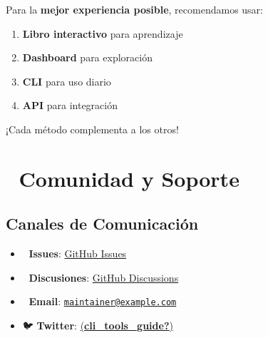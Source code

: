 \documentclass[
  11pt,
  letterpaper,
  oneside,
  openany]{scrbook}
\providecommand{\tightlist}{%
  \setlength{\itemsep}{0pt}\setlength{\parskip}{0pt}}
\begin{document}
\begin{tcolorbox}[enhanced jigsaw, coltitle=black, breakable, arc=.35mm, toprule=.15mm, colbacktitle=quarto-callout-important-color!10!white, colframe=quarto-callout-important-color-frame, opacityback=0, colback=white, bottomtitle=1mm, bottomrule=.15mm, rightrule=.15mm, left=2mm, toptitle=1mm, leftrule=.75mm, title=\textcolor{quarto-callout-important-color}{\faExclamation}\hspace{0.5em}{¡Importante!}, titlerule=0mm, opacitybacktitle=0.6]

Para la \textbf{mejor experiencia posible}, recomendamos usar:

\begin{enumerate}
\def\labelenumi{\arabic{enumi}.}
\tightlist
\item
  \textbf{Libro interactivo} para aprendizaje
\item
  \textbf{Dashboard} para exploración
\item
  \textbf{CLI} para uso diario
\item
  \textbf{API} para integración
\end{enumerate}

¡Cada método complementa a los otros! 🌟

\end{tcolorbox}

\section{🤝 Comunidad y Soporte}\label{comunidad-y-soporte}

\subsection{Canales de Comunicación}\label{canales-de-comunicaciuxf3n}

\begin{itemize}
\tightlist
\item
  🐛 \textbf{Issues}:
  \href{https://github.com/laguileracl/homebrew-cli-guide/issues}{GitHub
  Issues}
\item
  💬 \textbf{Discusiones}:
  \href{https://github.com/laguileracl/homebrew-cli-guide/discussions}{GitHub
  Discussions}
\item
  📧 \textbf{Email}:
  \href{mailto:maintainer@example.com}{\nolinkurl{maintainer@example.com}}
\item
  🐦 \textbf{Twitter}:
  \href{https://twitter.com/cli_tools_guide}{(\textbf{cli\_tools\_guide?})}
\end{itemize}
\end{document}
